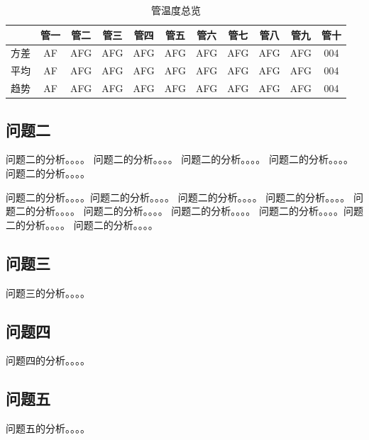         \begin{table}[H]
            \centering
            \begin{tabular}{ c|c|c|c|c|c|c|c|c|c|c  }
                \hline
                &管一&管二&管三&管四&管五&管六&管七&管八&管九&管十\\
                \hline
                方差& AF&AFG&AFG&AFG&AFG&AFG&AFG&AFG&AFG&004\\
                平均& AF&AFG&AFG&AFG&AFG&AFG&AFG&AFG&AFG&004\\
                趋势& AF&AFG&AFG&AFG&AFG&AFG&AFG&AFG&AFG&004\\
                \hline
            \end{tabular}
            \caption{管温度总览}
        \end{table}

    \subsection{问题二}
        问题二的分析。。。。
        问题二的分析。。。。
        问题二的分析。。。。
        问题二的分析。。。。
        问题二的分析。。。。

        问题二的分析。。。。问题二的分析。。。。
        问题二的分析。。。。
        问题二的分析。。。。
        问题二的分析。。。。
        问题二的分析。。。。
        问题二的分析。。。。
        问题二的分析。。。。问题二的分析。。。。
        问题二的分析。。。。

    \subsection{问题三}
        问题三的分析。。。。
    \subsection{问题四}
        问题四的分析。。。。
    \subsection{问题五}
        问题五的分析。。。。    